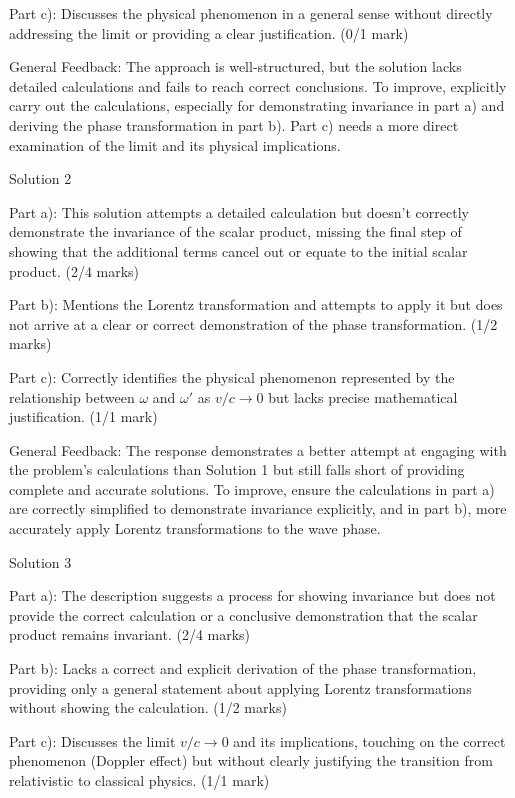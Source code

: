 \documentclass[a4paper,11pt]{article}
\begin{document}
Part c): Discusses the physical phenomenon in a general sense without directly addressing the limit or providing a clear justification. (0/1 mark)

General Feedback: The approach is well-structured, but the solution lacks detailed calculations and fails to reach correct conclusions. To improve, explicitly carry out the calculations, especially for demonstrating invariance in part a) and deriving the phase transformation in part b). Part c) needs a more direct examination of the limit and its physical implications.

Solution 2

Part a): This solution attempts a detailed calculation but doesn't correctly demonstrate the invariance of the scalar product, missing the final step of showing that the additional terms cancel out or equate to the initial scalar product. (2/4 marks)

Part b): Mentions the Lorentz transformation and attempts to apply it but does not arrive at a clear or correct demonstration of the phase transformation. (1/2 marks)

Part c): Correctly identifies the physical phenomenon represented by the relationship between \( \omega \) and \( \omega' \) as \( v/c \rightarrow 0 \) but lacks precise mathematical justification. (1/1 mark)

General Feedback: The response demonstrates a better attempt at engaging with the problem's calculations than Solution 1 but still falls short of providing complete and accurate solutions. To improve, ensure the calculations in part a) are correctly simplified to demonstrate invariance explicitly, and in part b), more accurately apply Lorentz transformations to the wave phase.

Solution 3

Part a): The description suggests a process for showing invariance but does not provide the correct calculation or a conclusive demonstration that the scalar product remains invariant. (2/4 marks)

Part b): Lacks a correct and explicit derivation of the phase transformation, providing only a general statement about applying Lorentz transformations without showing the calculation. (1/2 marks)

Part c): Discusses the limit \( v/c \rightarrow 0 \) and its implications, touching on the correct phenomenon (Doppler effect) but without clearly justifying the transition from relativistic to classical physics. (1/1 mark)
\end{document}
